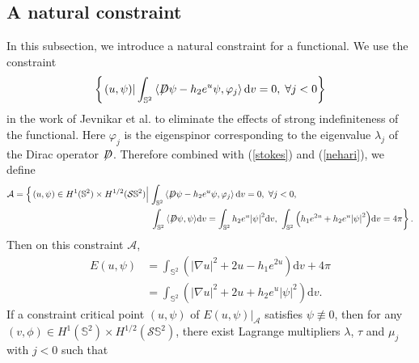 \documentclass[a4paper, 12pt]{article}
\def\slashiii#1{\setbox0=\hbox{$#1$}#1\hskip-\wd0\hbox to\wd0{\hss\sl/\/\hss}}
\begin{document}
\subsection{A natural constraint}
In this subsection, we introduce a natural constraint for a functional. We use the constraint
\begin{equation}\label{wu-nehari}
	\left\{ {\left. {\left( {u,\psi } \right)} \right|\int_{{\mathbb{S}^2}} {\left\langle {\slashiii{D}\psi  -{h_2} {e^{u}}\psi ,{\varphi _j}} \right\rangle {\text{d}{v}} = 0} ,\;\forall j < 0} \right\}
\end{equation}
in the work of Jevnikar et al. \cite{jevnikar2020existence1} to eliminate the effects of strong indefiniteness of the functional. Here $\varphi_j$ is the eigenspinor corresponding to the eigenvalue $\lambda_j$ of the Dirac operator $\slashiii{D}$.  Therefore combined with (\ref{stokes}) and (\ref{nehari}), we define
\begin{equation*}\begin{aligned}
		\mathcal{A} = \left\{ {\left. {\left( {u,\psi } \right) \in {H^1}(\mathbb{S}^2) \times {H^{1/2}(\mathcal{S}\mathbb{S}^2)}} \right|} \right.&\int_{{\mathbb{S}^2}} {\left\langle {\slashiii{D}\psi  -{h_2} {e^{u}}\psi ,{\varphi _j}} \right\rangle {\text{d}{v}}  = 0} ,\ \forall j < 0, \\
		& \left. {\int_{{\mathbb{S}^2}} {\left\langle {\slashiii{D}\psi ,\psi } \right\rangle }{\text{d}{v}}  = \int_{{\mathbb{S}^2}}{h_2} {{e^{u}}} {{\left| \psi  \right|}^2}}{\text{d}{v}},\ \int_{{\mathbb{S}^2}} {\left( {h_1{e^{2u}} + {h_2}{e^{u}}{{\left| \psi  \right|}^2}} \right)}{\text{d}{v}}  = 4\pi \right\}.
	\end{aligned}
\end{equation*}
Then on this constraint $\mathcal{A}$,
\begin{equation*}\begin{aligned}
		E\left( {u,\psi } \right) &= \int_{{\mathbb{S}^2}} {\left( {{{\left| {\nabla u} \right|}^2} + 2u - {h_1}{e^{2u}}} \right){\text{d}{v}} + 4\pi }   \\
		&= \int_{{\mathbb{S}^2}} {\left( {{{\left| {\nabla u} \right|}^2} + 2u +{h_2} {e^{u}}{{\left| \psi  \right|}^2}} \right)}{\text{d}{v}} .
	\end{aligned}
\end{equation*}
If a constraint critical point $(u,\psi)$ of ${\left. {E(u,\psi )} \right|_\mathcal{A}}$ satisfies $\psi\not\equiv 0$, then for any $(v,\phi)\in{H^1}({\mathbb{S}^2}) \times {H^{1/2}}\left( {\mathcal{S} {\mathbb{S}^2}} \right)$, there exist Lagrange multipliers $\lambda$, $\tau$ and $\mu_j$ with $j<0$ such that
\end{document}
